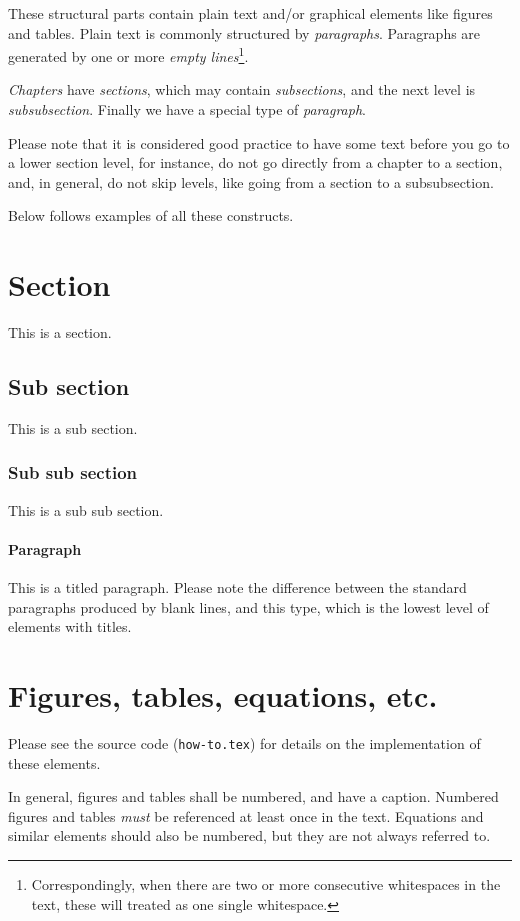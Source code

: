 These structural parts contain
plain text and/or graphical elements like figures and tables. 
Plain text is commonly structured by {\em paragraphs}. Paragraphs are generated by one or more {\em empty lines}\footnote{Correspondingly, when there are two or more       consecutive          whitespaces in the text, these will treated as one single whitespace.}. 

{\em Chapters} have {\em sections}, which may contain {\em subsections}, and the next level is {\em subsubsection}.
Finally we have a special type of {\em paragraph}.

Please note that it is considered good practice to have some text before you go to a lower section level, for instance, do not go directly from a chapter to a section, and, in general, do not skip levels, like going from a section to a subsubsection.

Below follows examples of all these constructs.


\section{Section} 
This is a section. \lipsum[10-12]
\subsection{Sub section} 
This is a sub section. \lipsum[13-14]
\subsubsection{Sub sub section} 
This is a sub sub section. \lipsum[15-16]
\paragraph{Paragraph} 
This is a titled paragraph.
Please note the difference between the standard paragraphs produced by blank lines, and this type, which is the lowest level of elements with titles.

\lipsum[17-18]

\section{Figures, tables, equations, etc.}

Please see the source code (\texttt{how-to.tex}) for details on the implementation of these elements.

In general, figures and tables shall be numbered, and have a caption. Numbered figures and tables {\em must} be referenced at least once in the text. Equations and similar elements should also be numbered, but they are not always referred to.

